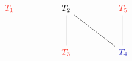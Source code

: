 \[\begin{tikzcd}
	{\color{redplot}{T_1}} && {T_2} && {\color{redplot}{T_5}} \\
	\\
	&& {\color{redplot}{T_3}} && {\color{blueplot}{T_4}}
	\arrow[no head, from=1-5, to=3-5]
	\arrow[no head, from=3-5, to=1-3]
	\arrow[no head, from=3-3, to=1-3]
\end{tikzcd}\]